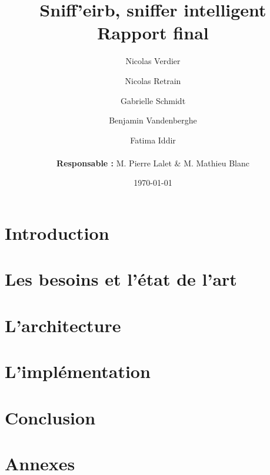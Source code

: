 \documentclass[a4]{report}
\begin{document}
		
	\title{\Large{\textbf{Sniff'eirb, sniffer intelligent}}\\\Huge{\textbf{Rapport final}}}
	\author{%
	Nicolas Verdier \and Nicolas Retrain \and Gabrielle Schmidt \and Benjamin Vandenberghe \and Fatima Iddir\\
	\\
	\textbf{Responsable : } M. Pierre Lalet & M. Mathieu Blanc}
	\date{\today}
	
	\maketitle %

	\tableofcontents{}
	\newpage
	
	\chapter*{Introduction}
		

	

		
	\chapter{Les besoins et l'état de l'art}
		
			
	\chapter{L'architecture}
		
		
	\chapter{L'implémentation}
		
	
						
	\chapter*{Conclusion}
		
	
	\chapter*{Annexes}
		
	
\end{document}
